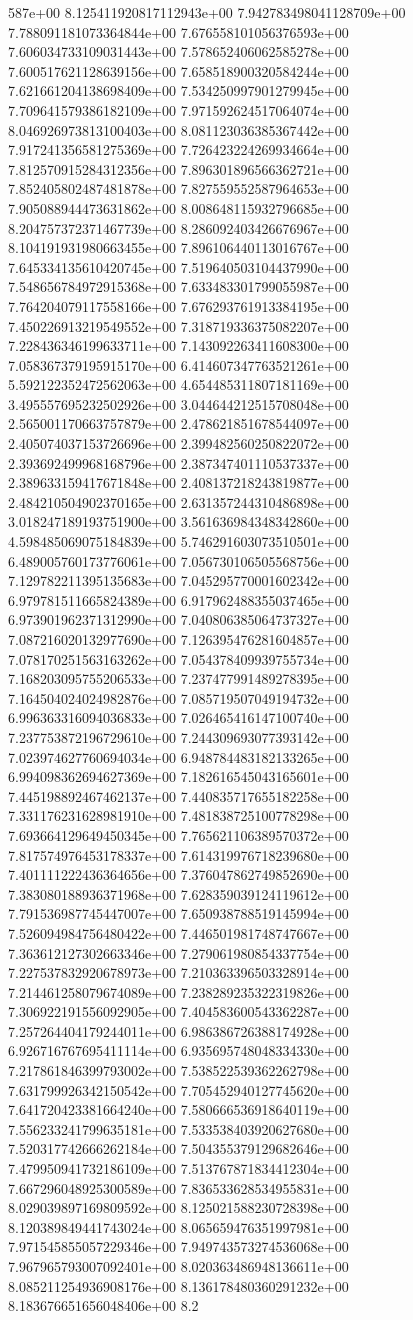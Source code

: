 587e+00	8.125411920817112943e+00	7.942783498041128709e+00	7.788091181073364844e+00	7.676558101056376593e+00	7.606034733109031443e+00	7.578652406062585278e+00	7.600517621128639156e+00	7.658518900320584244e+00	7.621661204138698409e+00	7.534250997901279945e+00	7.709641579386182109e+00	7.971592624517064074e+00	8.046926973813100403e+00	8.081123036385367442e+00	7.917241356581275369e+00	7.726423224269934664e+00	7.812570915284312356e+00	7.896301896566362721e+00	7.852405802487481878e+00	7.827559552587964653e+00	7.905088944473631862e+00	8.008648115932796685e+00	8.204757372371467739e+00	8.286092403426676967e+00	8.104191931980663455e+00	7.896106440113016767e+00	7.645334135610420745e+00	7.519640503104437990e+00	7.548656784972915368e+00	7.633483301799055987e+00	7.764204079117558166e+00	7.676293761913384195e+00	7.450226913219549552e+00	7.318719336375082207e+00	7.228436346199633711e+00	7.143092263411608300e+00	7.058367379195915170e+00	6.414607347763521261e+00	5.592122352472562063e+00	4.654485311807181169e+00	3.495557695232502926e+00	3.044644212515708048e+00	2.565001170663757879e+00	2.478621851678544097e+00	2.405074037153726696e+00	2.399482560250822072e+00	2.393692499968168796e+00	2.387347401110537337e+00	2.389633159417671848e+00	2.408137218243819877e+00	2.484210504902370165e+00	2.631357244310486898e+00	3.018247189193751900e+00	3.561636984348342860e+00	4.598485069075184839e+00	5.746291603073510501e+00	6.489005760173776061e+00	7.056730106505568756e+00	7.129782211395135683e+00	7.045295770001602342e+00	6.979781511665824389e+00	6.917962488355037465e+00	6.973901962371312990e+00	7.040806385064737327e+00	7.087216020132977690e+00	7.126395476281604857e+00	7.078170251563163262e+00	7.054378409939755734e+00	7.168203095755206533e+00	7.237477991489278395e+00	7.164504024024982876e+00	7.085719507049194732e+00	6.996363316094036833e+00	7.026465416147100740e+00	7.237753872196729610e+00	7.244309693077393142e+00	7.023974627760694034e+00	6.948784483182133265e+00	6.994098362694627369e+00	7.182616545043165601e+00	7.445198892467462137e+00	7.440835717655182258e+00	7.331176231628981910e+00	7.481838725100778298e+00	7.693664129649450345e+00	7.765621106389570372e+00	7.817574976453178337e+00	7.614319976718239680e+00	7.401111222436364656e+00	7.376047862749852690e+00	7.383080188936371968e+00	7.628359039124119612e+00	7.791536987745447007e+00	7.650938788519145994e+00	7.526094984756480422e+00	7.446501981748747667e+00	7.363612127302663346e+00	7.279061980854337754e+00	7.227537832920678973e+00	7.210363396503328914e+00	7.214461258079674089e+00	7.238289235322319826e+00	7.306922191556092905e+00	7.404583600543362287e+00	7.257264404179244011e+00	6.986386726388174928e+00	6.926716767695411114e+00	6.935695748048334330e+00	7.217861846399793002e+00	7.538522539362262798e+00	7.631799926342150542e+00	7.705452940127745620e+00	7.641720423381664240e+00	7.580666536918640119e+00	7.556233241799635181e+00	7.533538403920627680e+00	7.520317742666262184e+00	7.504355379129682646e+00	7.479950941732186109e+00	7.513767871834412304e+00	7.667296048925300589e+00	7.836533628534955831e+00	8.029039897169809592e+00	8.125021588230728398e+00	8.120389849441743024e+00	8.065659476351997981e+00	7.971545855057229346e+00	7.949743573274536068e+00	7.967965793007092401e+00	8.020363486948136611e+00	8.085211254936908176e+00	8.136178480360291232e+00	8.183676651656048406e+00	8.2